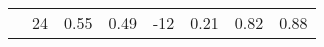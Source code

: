 \begin{table}
\begin{center}
\begin{tabular}{c|ccccccc}
   & 24  &   0.55  &   0.49  &  -12 & 0.21 & 0.82 & 0.88\\%

\end{tabular}
\end{center}
\end{table}
